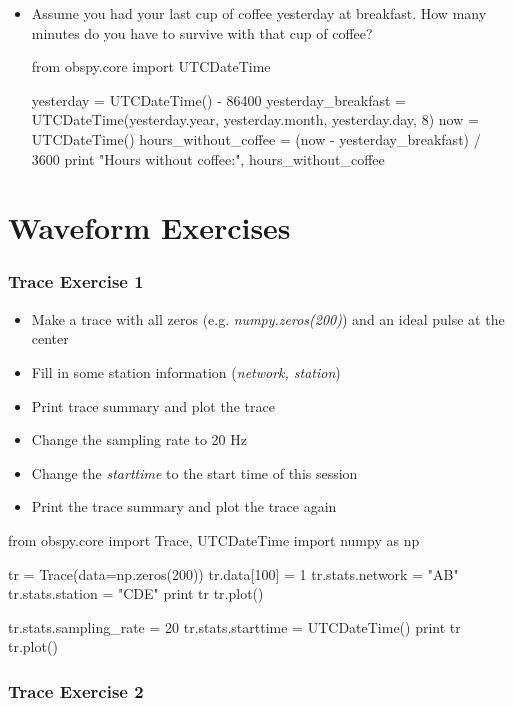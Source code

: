 \documentclass[10pt]{article}
\begin{document}
\begin{itemize}
\item Assume you had your last cup of coffee yesterday at breakfast.
    How many minutes do you have to survive with that cup of coffee?

\begin{python}
from obspy.core import UTCDateTime

yesterday = UTCDateTime() - 86400
yesterday_breakfast = UTCDateTime(yesterday.year, yesterday.month, yesterday.day, 8)
now = UTCDateTime()
hours_without_coffee = (now - yesterday_breakfast) / 3600
print "Hours without coffee:", hours_without_coffee
\end{python}

\end{itemize}

\newpage
\section*{Waveform Exercises}
\subsubsection*{Trace Exercise 1}
    \begin{itemize}
        \item Make a trace with all zeros (e.g. \textit{numpy.zeros(200)}) and an ideal pulse at the center
        \item Fill in some station information (\textit{network, station})
        \item Print trace summary and plot the trace
        \item Change the sampling rate to 20 Hz
        \item Change the \textit{starttime} to the start time of this session
        \item Print the trace summary and plot the trace again
    \end{itemize}

    \begin{python}
from obspy.core import Trace, UTCDateTime
import numpy as np

tr = Trace(data=np.zeros(200))
tr.data[100] = 1
tr.stats.network = "AB"
tr.stats.station = "CDE"
print tr
tr.plot()

tr.stats.sampling_rate = 20
tr.stats.starttime = UTCDateTime()
print tr
tr.plot()
    \end{python}

\subsubsection*{Trace Exercise 2}
\end{document}
